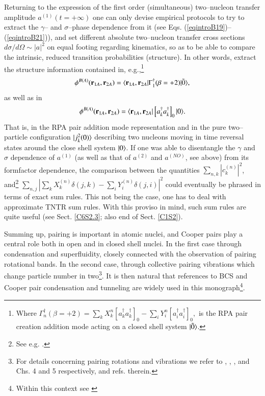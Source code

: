 Returning to the expression of the first order (simultaneous) two--nucleon transfer amplitude $a^{(1)}(t=+\infty)$ one can only devise empirical protocols to try to extract the $\gamma$-- and $\sigma$--phase dependence  from it (see Eqs. (\ref{eqintroB19})--(\ref{eqintroB21})), and set different absolute two--nucleon transfer cross sections $d\sigma/d\Omega\sim |a|^2$ on equal footing regarding kinematics, so as to be able to compare the intrinsic, reduced transition probabilities (structure). In other words, extract the structure information contained in, e.g.,\footnote{Where
$\Gamma_n^\dagger(\beta=+2)=\sum_k X_k^n\left[a^\dagger_ka^\dagger_k\right]_0-\sum_i Y^n_i \left[a^\dagger_i a^\dagger_i\right]_0,$
is the RPA pair creation addition mode acting on  a closed shell system $|{\tilde 0} \rangle$. }
 \begin{align}
\phi^{B(A)}(\mathbf r_{1A},\mathbf r_{2A})=\langle {\mathbf r_{1A},\mathbf r_{2A}|\Gamma^\dagger_1(\beta=+2)|\tilde 0} \rangle,
 \end{align}
 as well as in
 \begin{align}
\phi^{B(A)}(\mathbf r_{1A},\mathbf r_{2A})=\langle {\mathbf r_{1A},\mathbf r_{2A}}|\left[a^\dagger_ka^\dagger_k\right]_0|{0} \rangle.
 \end{align}
That is, in the RPA pair addition mode representation and in the pure two--particle configuration $|{j^2_k(0)} \rangle$ describing two nucleons moving in time reversal states around the close shell system $|{0} \rangle$. If one was able to disentangle the $\gamma$ and $\sigma$ dependence of $a^{(1)}$ (as well as that of $a^{(2)}$ and $a^{(NO)}$, see above) from its formfactor dependence, the comparison between the quantities $\sum_{n,k}|c^{(n)}_k|^2$, and\footnote{See e.g. \cite{Broglia:67}.} $\sum_{n,j}\left|\sum_kX^{(n)}_k\delta(j,k)-\sum_iY^{(n)}_i\delta(j,i)\right|^2$ could  eventually be phrased in terms of exact sum rules. This not being  the case, one has to  deal with approximate TNTR sum rules. With this proviso in mind, such sum rules are quite useful (see Sect. \ref{C6S2.3}; also end of Sect. \ref{C1S2}). 


Summing up, pairing is important in atomic nuclei, and Cooper pairs play a central role both in open and in closed shell nuclei. In the first case through condensation and superfluidity, closely connected with the observation of pairing rotational bands. In the second case, through collective pairing vibrations which change particle number in two\footnote{For details concerning pairing rotations and vibrations we refer to \cite{Bohr:68}, \cite{Bohr:75}, \cite{Bes:66}, \cite{Bes:77} and \cite{Brink:05} Chs. 4 and 5 respectively, and refs. therein.}. It is then  natural that references to BCS and Cooper pair condensation and tunneling are widely used in this monograph\footnote{Within this context see \cite{Broglia:13}}.
